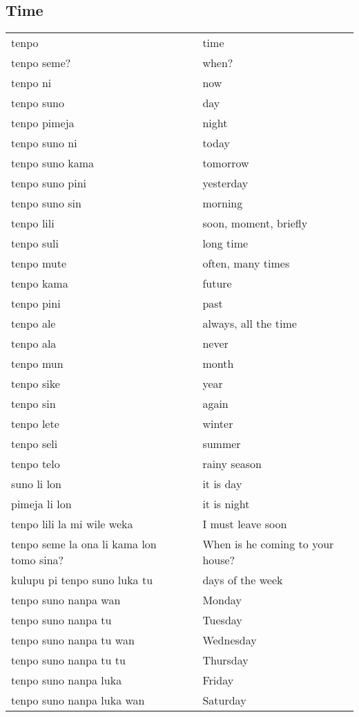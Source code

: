 \subsection{Time}
%
\begin{supertabular}{p{4,5cm}|ll}
tenpo && time \\
tenpo seme? && when? \\
tenpo ni && now \\
tenpo suno && day \\
tenpo pimeja && night \\
tenpo suno ni && today \\
tenpo suno kama && tomorrow \\
tenpo suno pini && yesterday \\
tenpo suno sin && morning \\
tenpo lili && soon, moment, briefly \\ 
tenpo suli && long time \\
tenpo mute && often, many times \\
tenpo kama && future \\
tenpo pini && past \\
tenpo ale && always, all the time \\
tenpo ala && never \\
tenpo mun && month \\
tenpo sike && year \\
tenpo sin && again \\
tenpo lete && winter \\
tenpo seli && summer \\
tenpo telo && rainy season \\
suno li lon && it is day \\
pimeja li lon && it is night \\
tenpo lili la mi wile weka && I must leave soon \\ 
tenpo seme la ona li kama lon tomo sina? && When is he coming to your house? \\
kulupu pi tenpo suno luka tu && days of the week \\
tenpo suno nanpa wan && Monday \\
tenpo suno nanpa tu && Tuesday \\
tenpo suno nanpa tu wan && Wednesday \\
tenpo suno nanpa tu tu && Thursday \\
tenpo suno nanpa luka && Friday \\
tenpo suno nanpa luka wan && Saturday \\

\end{supertabular}
